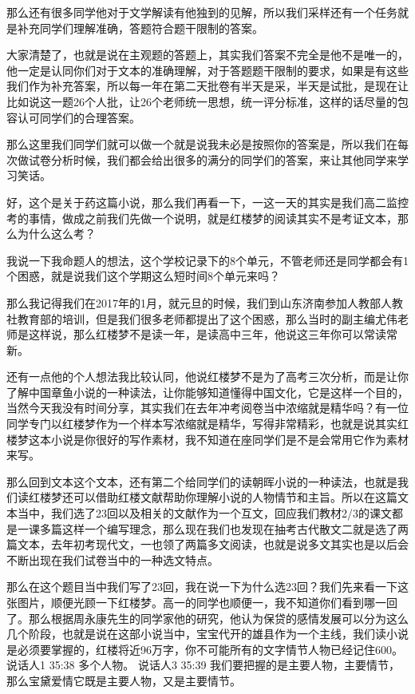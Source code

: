 \documentclass{ctexart}
\renewcommand{\\}{\par}
\begin{document}
那么还有很多同学他对于文学解读有他独到的见解，所以我们采样还有一个任务就是补充同学们理解准确，答题符合题干限制的答案。

大家清楚了，也就是说在主观题的答题上，其实我们答案不完全是他不是唯一的，他一定是认同你们对于文本的准确理解，对于答题题干限制的要求，如果是有这些我们作为补充答案，所以每一年在第二天批卷有半天是采，半天是试批，是现在让比如说这一题26个人批，让26个老师统一思想，统一评分标准，这样的话尽量的包容认可同学们的合理答案。

那么这里我们同学们就可以做一个就是说我未必是按照你的答案是，所以我们在每次做试卷分析时候，我们都会给出很多的满分的同学们的答案，来让其他同学来学习笑话。

好，这个是关于药这篇小说，那么我们再看一下，一这一天的其实是我们高二监控考的事情，做成之前我们先做一个说明，就是红楼梦的阅读其实不是考证文本，那么为什么这么考？

我说一下我命题人的想法，这个学校记录下的8个单元，不管老师还是同学都会有1个困惑，就是说我们这个学期这么短时间8个单元来吗？

那么我记得我们在2017年的1月，就元旦的时候，我们到山东济南参加人教部人教社教育部的培训，但是我们很多老师都提出了这个困惑，那么当时的副主编尤伟老师是这样说，那么红楼梦不是读一年，是读高中三年，他说这三年你可以常读常新。

还有一点他的个人想法我比较认同，他说红楼梦不是为了高考三次分析，而是让你了解中国章鱼小说的一种读法，让你能够知道懂得中国文化，它是这样一个目的，当然今天我没有时间分享，其实我们在去年冲考阅卷当中浓缩就是精华吗？有一位同学专门以红楼梦作为一个样本写浓缩就是精华，写得非常精彩，也就是说其实红楼梦这本小说是你很好的写作素材，我不知道在座同学们是不是会常用它作为素材来写。

那么回到文本这个文本，还有第二个给同学们的读朝晖小说的一种读法，也就是我们读红楼梦还可以借助红楼文献帮助你理解小说的人物情节和主旨。所以在这篇文本当中，我们选了23回以及相关的文献作为一个互文，回应我们教材2/3的课文都是一课多篇这样一个编写理念，那么现在我们也发现在抽考古代散文二就是选了两篇文本，去年初考现代文，一也领了两篇多文阅读，也就是说多文其实也是以后会不断出现在我们试卷当中的一种选文特点。

那么在这个题目当中我们写了23回，我在说一下为什么选23回？我们先来看一下这张图片，顺便光顾一下红楼梦。高一的同学也顺便一，我不知道你们看到哪一回了。那么根据周永康先生的同学家他的研究，他认为保贷的感情发展可以分为这么几个阶段，也就是说在这部小说当中，宝宝代开的雄县作为一个主线，我们读小说是必须要掌握的，红楼将近96万字，你不可能所有的文字情节人物已经记住600。
说话人1 35:38
多个人物。
说话人3 35:39
我们要把握的是主要人物，主要情节，那么宝黛爱情它既是主要人物，又是主要情节。
\end{document}
